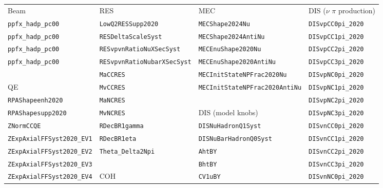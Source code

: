 \documentclass{article}
\begin{document}
\begin{table}[hbt]
\centering
{\smaller
\begin{tabular}{llll}
Beam                               & RES                                & MEC                                    & DIS ($\nu$ $\pi$ production) \\
\texttt{ppfx\_hadp\_pc00}          & \texttt{LowQ2RESSupp2020}          & \texttt{MECShape2024Nu}                & \texttt{DISvpCC0pi\_2020} \\
\texttt{ppfx\_hadp\_pc00}          & \texttt{RESDeltaScaleSyst}         & \texttt{MECShape2024AntiNu}            & \texttt{DISvpCC1pi\_2020} \\
\texttt{ppfx\_hadp\_pc00}          & \texttt{RESvpvnRatioNuXSecSyst}    & \texttt{MECEnuShape2020Nu}             & \texttt{DISvpCC2pi\_2020} \\
\texttt{ppfx\_hadp\_pc00}          & \texttt{RESvpvnRatioNubarXSecSyst} & \texttt{MECEnuShape2020AntiNu}         & \texttt{DISvpCC3pi\_2020} \\
                                   & \texttt{MaCCRES}                   & \texttt{MECInitStateNPFrac2020Nu}      & \texttt{DISvpNC0pi\_2020} \\
QE                                 & \texttt{MvCCRES}                   & \texttt{MECInitStateNPFrac2020AntiNu}  & \texttt{DISvpNC1pi\_2020} \\
\texttt{RPAShapeenh2020}           & \texttt{MaNCRES}                   &                                        & \texttt{DISvpNC2pi\_2020} \\
\texttt{RPAShapesupp2020}          & \texttt{MvNCRES}                   & DIS (model knobs)                      & \texttt{DISvpNC3pi\_2020} \\
\texttt{ZNormCCQE}                 & \texttt{RDecBR1gamma}              & \texttt{DISNuHadronQ1Syst}             & \texttt{DISvnCC0pi\_2020} \\
\texttt{ZExpAxialFFSyst2020\_EV1}  & \texttt{RDecBR1eta}                & \texttt{DISNuBarHadronQ0Syst}          & \texttt{DISvnCC1pi\_2020} \\
\texttt{ZExpAxialFFSyst2020\_EV2}  & \texttt{Theta\_Delta2Npi}          & \texttt{AhtBY}                         & \texttt{DISvnCC2pi\_2020} \\
\texttt{ZExpAxialFFSyst2020\_EV3}  &                                    & \texttt{BhtBY}                         & \texttt{DISvnCC3pi\_2020} \\
\texttt{ZExpAxialFFSyst2020\_EV4}  & COH                                & \texttt{CV1uBY}                        & \texttt{DISvnNC0pi\_2020} \\

\end{tabular}}
\end{table}
\end{document}
